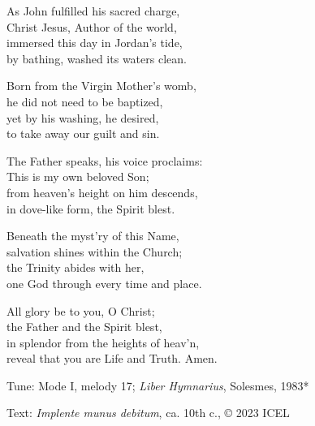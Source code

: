 \hymn

\settowidth{\versewidth}{reveal that you are Life and Truth. Amen.}

\begin{hymnverse}%
As John fulfilled his sacred charge,\\
Christ Jesus, Author of the world,\\
immersed this day in Jordan’s tide,\\
by bathing, washed its waters clean.

Born from the Virgin Mother’s womb,\\
he did not need to be baptized,\\
yet by his washing, he desired,\\
to take away our guilt and sin.

The Father speaks, his voice proclaims:\\
This is my own beloved Son;\\
from heaven’s height on him descends,\\
in dove-like form, the Spirit blest.

Beneath the myst’ry of this Name,\\
salvation shines within the Church;\\
the Trinity abides with her,\\
one God through every time and place.

All glory be to you, O Christ;\\
the Father and the Spirit blest,\\
in splendor from the heights of heav’n,\\
reveal that you are Life and Truth. Amen.
\end{hymnverse}

\begin{hymnsource}
Tune: Mode I, melody 17; \emph{Liber Hymnarius}, Solesmes, 1983*

Text: \emph{Implente munus debitum}, ca. 10th c., © 2023 ICEL
\end{hymnsource}